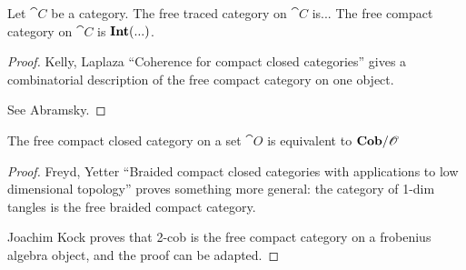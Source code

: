 \documentclass[12pt,oneside,article,draft]{memoir}
\begin{document}
\begin{proposition}\label{prop:free traced and compact}
   Let $\cat{C}$ be a category.
   The free traced category on $\cat{C}$ is...
   The free compact category on $\cat{C}$ is $\mathbf{Int}(...)$.
\end{proposition}
\begin{proof}
   Kelly, Laplaza ``Coherence for compact closed categories'' gives a combinatorial description of the free compact category on one object.

   See Abramsky.
\end{proof}

\begin{proposition}\label{prop:free compact is Cob}
   The free compact closed category on a set $\cat{O}$ is equivalent to $\mathbf{Cob}/\mathscr{O}$
\end{proposition}
\begin{proof}
   Freyd, Yetter ``Braided compact closed categories with applications to low dimensional topology'' proves something more general: the category of 1-dim tangles is the free braided compact category.

   Joachim Kock proves that 2-cob is the free compact category on a frobenius algebra object, and the proof can be adapted.
\end{proof}



\end{document}
